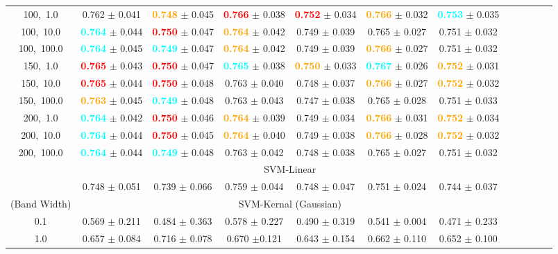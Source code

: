\documentclass{article}
\newcommand\boldblue[1]{\textcolor{cyan}{\textbf{#1}}}
\newcommand\boldred[1]{\textcolor{red}{\textbf{#1}}}
\newcommand\boldbrown[1]{\textcolor{orange}{\textbf{#1}}}
\theoremstyle{plain}
\begin{document}
\begin{table*}
\begin{center}
{\begin{tabular}{*{12}{c}}
100,\ 1.0&0.762 $\pm$ 0.041&\boldbrown{0.748} $\pm$ 0.045&\boldred{0.766} $\pm$ 0.038&\boldred{0.752} $\pm$ 0.034&\boldbrown{0.766} $\pm$ 0.032&\boldblue{0.753} $\pm$ 0.035\\
100,\ 10.0&\boldblue{0.764} $\pm$ 0.044&\boldred{0.750} $\pm$ 0.047&\boldbrown{0.764} $\pm$ 0.042&0.749 $\pm$ 0.039&0.765 $\pm$ 0.027&0.751 $\pm$ 0.032\\
100,\ 100.0&\boldblue{0.764} $\pm$ 0.045&\boldblue{0.749} $\pm$ 0.047&\boldbrown{0.764} $\pm$ 0.042&0.749 $\pm$ 0.039&\boldbrown{0.766} $\pm$ 0.027&0.751 $\pm$ 0.032\\ 

150,\ 1.0&\boldred{0.765} $\pm$ 0.043&\boldred{0.750} $\pm$ 0.047&\boldblue{0.765} $\pm$ 0.038&\boldbrown{0.750} $\pm$ 0.033&\boldblue{0.767} $\pm$ 0.026&\boldbrown{0.752} $\pm$ 0.031\\
150,\ 10.0&\boldred{0.765} $\pm$ 0.044&\boldred{0.750} $\pm$ 0.048&0.763 $\pm$ 0.040&0.748 $\pm$ 0.037&\boldbrown{0.766} $\pm$ 0.027&\boldbrown{0.752} $\pm$ 0.032\\
150,\ 100.0&\boldbrown{0.763} $\pm$ 0.045&\boldblue{0.749} $\pm$ 0.048&0.763 $\pm$ 0.043&0.747 $\pm$ 0.038&0.765 $\pm$ 0.028&0.751 $\pm$ 0.033\\ 

200,\ 1.0&\boldblue{0.764} $\pm$ 0.042&\boldred{0.750} $\pm$ 0.046&\boldbrown{0.764} $\pm$ 0.039&0.749 $\pm$ 0.034&\boldbrown{0.766} $\pm$ 0.031&\boldbrown{0.752} $\pm$ 0.034\\
200,\ 10.0&\boldblue{0.764} $\pm$ 0.044&\boldred{0.750} $\pm$ 0.045&\boldbrown{0.764} $\pm$ 0.040&0.749 $\pm$ 0.038&\boldbrown{0.766} $\pm$ 0.028&\boldbrown{0.752} $\pm$ 0.032\\
200,\ 100.0&\boldblue{0.764} $\pm$ 0.044&\boldblue{0.749} $\pm$ 0.048&0.763 $\pm$ 0.042&0.748 $\pm$ 0.038&0.765 $\pm$ 0.027&0.751 $\pm$ 0.032\\ 	
				


\cmidrule(lr){1-1}
\cmidrule(lr){1-7}
& \multicolumn{6}{c}{SVM-Linear}\\
\cmidrule(lr){1-7}
&0.748 $\pm$ 0.051&0.739 $\pm$ 0.066&0.759 $\pm$ 0.044&0.748 $\pm$ 0.047&0.751 $\pm$ 0.024&0.744 $\pm$ 0.037\\

\cmidrule(lr){1-1}
\cmidrule(lr){1-7}
(Band Width)& \multicolumn{6}{c}{SVM-Kernal (Gaussian)}\\
\cmidrule(lr){1-7}
0.1&0.569 $\pm$ 0.211&0.484 $\pm$ 0.363&0.578 $\pm$ 0.227&0.490 $\pm$ 0.319&0.541 $\pm$ 0.004&0.471 $\pm$ 0.233\\
1.0&0.657 $\pm$ 0.084&0.716 $\pm$ 0.078&0.670 $\pm$0.121&0.643 $\pm$ 0.154&0.662 $\pm$ 0.110&0.652 $\pm$ 0.100\\


\end{tabular}}
\end{center}
\end{table*}
\end{document}
